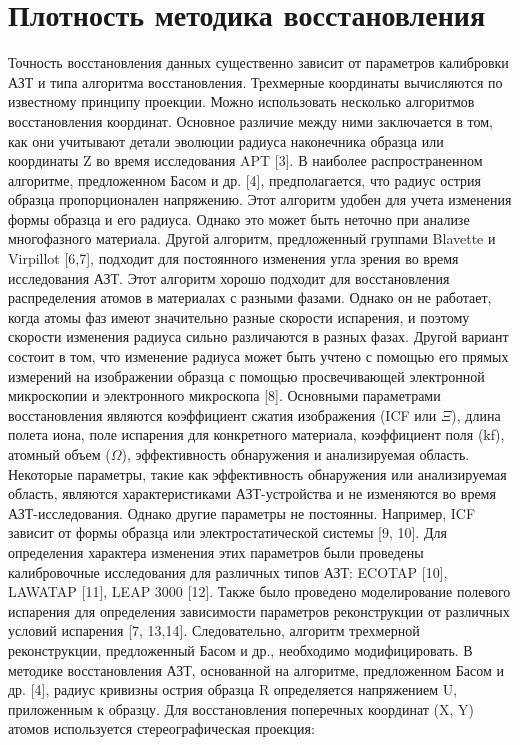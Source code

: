 \clearpage %
\section{Плотность методика восстановления}\label{sec:ch3/sect4}

Точность восстановления данных существенно зависит от параметров калибровки АЗТ и типа алгоритма восстановления. Трехмерные координаты вычисляются по известному принципу проекции. Можно использовать несколько алгоритмов восстановления координат. Основное различие между ними заключается в том, как они учитывают детали эволюции радиуса наконечника образца или координаты Z во время исследования APT [3]. В наиболее распространенном алгоритме, предложенном Басом и др. [4], предполагается, что радиус острия образца пропорционален напряжению. Этот алгоритм удобен для учета изменения формы образца и его радиуса. Однако это может быть неточно при анализе многофазного материала. Другой алгоритм, предложенный группами Blavette и Virpillot [6,7], подходит для постоянного изменения угла зрения во время исследования АЗТ. Этот алгоритм хорошо подходит для восстановления распределения атомов в материалах с разными фазами. Однако он не работает, когда атомы фаз имеют значительно разные скорости испарения, и поэтому скорости изменения радиуса сильно различаются в разных фазах. Другой вариант состоит в том, что изменение радиуса может быть учтено с помощью его прямых измерений на изображении образца с помощью просвечивающей электронной микроскопии и электронного микроскопа [8]. Основными параметрами восстановления являются коэффициент сжатия изображения (ICF или $\Xi$), длина полета иона, поле испарения для конкретного материала, коэффициент поля (kf), атомный объем ($\Omega$), эффективность обнаружения и анализируемая область. Некоторые параметры, такие как эффективность обнаружения или анализируемая область, являются характеристиками АЗТ-устройства и не изменяются во время АЗТ-исследования. Однако другие параметры не постоянны. Например, ICF зависит от формы образца или электростатической системы [9, 10]. Для определения характера изменения этих параметров были проведены калибровочные исследования для различных типов АЗТ: ECOTAP [10], LAWATAP [11], LEAP 3000 [12]. Также было проведено моделирование полевого испарения для определения зависимости параметров реконструкции от различных условий испарения [7, 13,14]. Следовательно, алгоритм трехмерной реконструкции, предложенный Басом и др., необходимо модифицировать. В методике восстановления АЗТ, основанной на алгоритме, предложенном Басом и др. [4], радиус кривизны острия образца R определяется напряжением U, приложенным к образцу. Для восстановления поперечных координат (X, Y) атомов используется стереографическая проекция:

